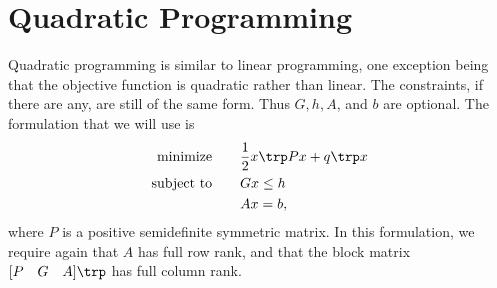 \begin{comment}
>>> h = matrix([ 0., 0., 0., 0., 0., 0.,])
>>> o = matrix([4., 7., 6., 8., 8., 9])
>>> A = matrix([ [1., 0., 0., 1., 0.],
             [1., 0., 0., 0., 1.],
             [0., 1., 0., 1., 0.],
             [0., 1., 0., 0., 1.],
             [0., 0., 1., 1., 0.],
             [0., 0., 1., 0., 1.] ])
>>> b = matrix([7., 2., 4., 5., 8])
>>> sol = glpk.ilp(o,G,h,A,b)
>>> print sol[1]
\end{lstlisting}

\textbf{Problem 2}
Choose one of these methods and compare the optimal values for the integer linear program to the result you received above.

\textbf{Problem 3}
Create the dual problem for the linear program and solve.
Compare your answer to the dual value cvxopt returned.
\end{comment}

\section*{Quadratic Programming}

Quadratic programming is similar to linear programming, one exception being that the objective function is quadratic rather than linear.
The constraints, if there are any, are still of the same form.
Thus $G, h, A$, and $b$ are optional. The formulation that we will use is
\begin{align*}
\text{minimize}\qquad &\frac{1}{2}x\trp Px + q\trp x \\
\text{subject to}\qquad &Gx \leq h\\
 &Ax = b,
\end{align*}
where $P$ is a positive semidefinite symmetric matrix.
In this formulation, we require again that $A$ has full row rank, and that the block matrix
$[P \quad G \quad A]\trp $ has full column rank.

